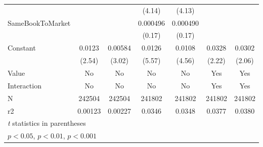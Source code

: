 {\begin{tabular}{l*{6}{c}}
                    &                     &                     &      (4.14)         &      (4.13)         &                     &                     \\
[1em]
SameBookToMarket    &                     &                     &    0.000496         &    0.000490         &                     &                     \\
                    &                     &                     &      (0.17)         &      (0.17)         &                     &                     \\
[1em]
Constant            &      0.0123\sym{*}  &     0.00584\sym{**} &      0.0126\sym{***}&      0.0108\sym{***}&      0.0328\sym{*}  &      0.0302\sym{*}  \\
                    &      (2.54)         &      (3.02)         &      (5.57)         &      (4.56)         &      (2.22)         &      (2.06)         \\
\hline
Value               &          No         &          No         &          No         &          No         &         Yes         &         Yes         \\
Interaction         &          No         &          No         &          No         &          No         &         Yes         &         Yes         \\
N                   &      242504         &      242504         &      241802         &      241802         &      241802         &      241802         \\
r2                  &     0.00123         &     0.00227         &      0.0346         &      0.0348         &      0.0377         &      0.0380         \\
\hline\hline
\multicolumn{7}{l}{\footnotesize \textit{t} statistics in parentheses}\\
\multicolumn{7}{l}{\footnotesize \sym{*} \(p<0.05\), \sym{**} \(p<0.01\), \sym{***} \(p<0.001\)}\\
\end{tabular}
}
